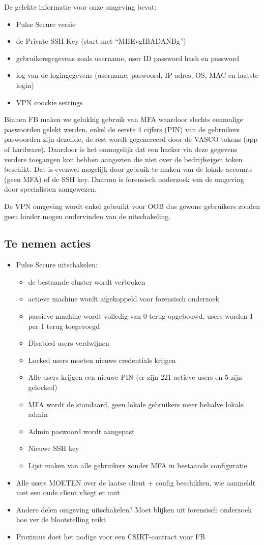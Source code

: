 \documentclass[11pt]{article}
\begin{document}
De gelekte informatie voor onze omgeving bevat:
\begin{itemize}
\item Pulse Secure versie
\item de Private SSH Key (start met “MIIEvgIBADANBg”)
\item gebruikersgegevens zoals username, user ID password hash en password
\item log van de logingegevens (username, paswoord, IP adres, OS, MAC en laatste login)
\item VPN coockie settings
\end{itemize}

Binnen FB maken we gelukkig gebruik van MFA waardoor slechts eenmalige paswoorden gelekt werden, enkel de eerste 4 cijfers (PIN) van de gebruikers paswoorden zijn dezelfde, de rest wordt gegenereerd door de VASCO tokens (app of hardware). Daardoor is het onmogelijk dat een hacker via deze gegevens verdere toegangen kon hebben aangezien die niet over de bedrijfseigen token beschikt. Dat is evenwel mogelijk door gebruik te maken van de lokale accounts (geen MFA) of de SSH key.
Daarom is forensisch onderzoek van de omgeving door specialisten aangewezen.

De VPN omgeving wordt enkel gebruikt voor OOB dus gewone gebruikers zouden geen hinder mogen ondervinden van de uitschakeling.

\subsection{Te nemen acties}
\label{sec:org39fee76}
\begin{itemize}
\item Pulse Secure uitschakelen:
\begin{itemize}
\item de bestaande cluster wordt verbroken
\item actieve machine wordt afgekoppeld voor forensisch onderzoek
\item passieve machine wordt volledig van 0 terug opgebouwd, users worden 1 per 1 terug toegevoegd
\item Disabled users verdwijnen
\item Locked users moeten nieuwe credentials krijgen
\item Alle users krijgen een nieuwe PIN (er zijn 221 actieve users en 5 zijn gelocked)
\item MFA wordt de standaard, geen lokale gebruikers meer behalve lokale admin
\item Admin paswoord wordt aangepast
\item Nieuwe SSH key
\item Lijst maken van alle gebruikers zonder MFA in bestaande configuratie
\end{itemize}
\item Alle users MOETEN over de laatse client + config beschikken, wie aanmeldt met een oude client vliegt er uuit
\item Andere delen omgeving uitschakelen? Moet blijken uit forensisch onderzoek hoe ver de blootstelling reikt
\item Proximus doet het nodige voor een CSIRT-contract voor FB
\end{itemize}
\end{document}
